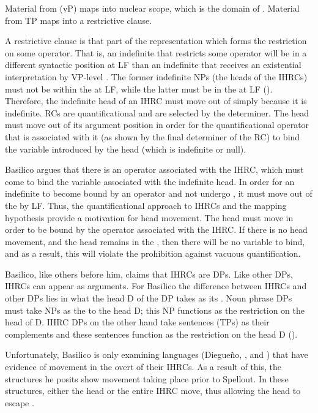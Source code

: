 \documentclass[output=paper]{LSP/langsci}
\begin{document}
\ea \label{boyle45}
\begin{xlist}
\ex Material from  (vP) maps into nuclear scope, which is the domain of .
\ex Material from TP maps into a restrictive clause.
\end{xlist}
\z
 
A restrictive clause is that part of the representation which forms the restriction on some operator. That is, an indefinite that restricts some operator will be in a different syntactic position at LF than an indefinite that receives an existential interpretation by VP-level . The former indefinite NPs (the heads of the IHRCs) must not be within the  at LF, while the latter must be in the  at LF (\citealt{Basilico1996}). Therefore, the indefinite head of an IHRC must move out of  simply because it is indefinite. RCs are quantificational and are selected by the determiner. The head must move out of its argument position in order for the quantificational operator that is associated with it (as shown by the final determiner of the RC) to bind the variable introduced by the head (which is indefinite or null).   
	
Basilico argues that there is an operator associated with the IHRC, which must come to bind the variable associated with the indefinite head. In order for an indefinite to become bound by an operator and not undergo , it must move out of the  by LF. Thus, the quantificational approach to IHRCs and the mapping hypothesis provide a motivation for head movement. The head must move in order to be bound by the operator associated with the IHRC. If there is no head movement, and the head remains in the , then there will be no variable to bind, and as a result, this will violate the prohibition against vacuous quantification.  
	
Basilico, like others before him, claims that IHRCs are DPs. Like other DPs, IHRCs can appear as arguments. For Basilico the difference between IHRCs and other DPs lies in what the head D of the DP takes as its . Noun phrase DPs must take NPs as the  to the head D; this NP functions as the restriction on the head of D. IHRC DPs on the other hand take sentences (TPs) as their complements and these sentences function as the restriction on the head D (\citealt{Basilico1996}). 
	
Unfortunately, Basilico is only examining languages (Diegue\~no, , and ) that have evidence of movement in the overt  of their IHRCs. As a result of this, the structures he posits show movement taking place prior to Spellout. In these structures, either the head or the entire IHRC move, thus allowing the head to escape .   
	
\end{document}
